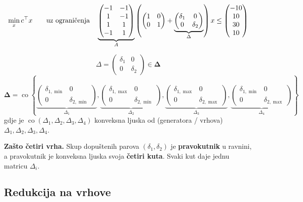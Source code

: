 \[
\min_x c\T x \qquad \uzogr
\underbrace{\begin{pmatrix}-1&-1\\1&-1\\1&1\\-1&1\end{pmatrix}}_{A}
\left(\begin{pmatrix}1&0\\0&1\end{pmatrix}
+ \underbrace{\begin{pmatrix}\delta_1&0\\0&\delta_2\end{pmatrix}}_{\Delta}
\right)x
\le \begin{pmatrix}-10\\10\\30\\10\end{pmatrix}
\]

\[
\Delta = \begin{pmatrix}\delta_1&0\\0&\delta_2\end{pmatrix} \in \boldsymbol\Delta
\]
\[
\boldsymbol\Delta = \operatorname{co}\left\{
\underbrace{\begin{pmatrix}\delta_{1,\min}&0\\0&\delta_{2,\min}\end{pmatrix}}_{\Delta_1},
\underbrace{\begin{pmatrix}\delta_{1,\max}&0\\0&\delta_{2,\min}\end{pmatrix}}_{\Delta_2},
\underbrace{\begin{pmatrix}\delta_{1,\max}&0\\0&\delta_{2,\max}\end{pmatrix}}_{\Delta_3},
\underbrace{\begin{pmatrix}\delta_{1,\min}&0\\0&\delta_{2,\max}\end{pmatrix}}_{\Delta_4}
\right\}
\]
gdje je $\operatorname{co}(\Delta_1,\Delta_2,\Delta_3,\Delta_4)$ konveksna
ljuska od (generatora / vrhova) $\Delta_1,\Delta_2,\Delta_3,\Delta_4$.

\textbf{Zašto četiri vrha.} Skup dopuštenih parova $(\delta_1,\delta_2)$ je
\textbf{pravokutnik} u ravnini, a pravokutnik je konveksna ljuska svoja
\textbf{četiri kuta}. Svaki kut daje jednu matricu $\Delta_i$.

\subsection{Redukcija na vrhove}

